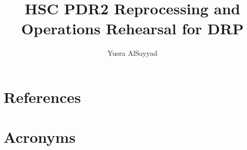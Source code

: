 \documentclass[OPS,authoryear,toc]{lsstdoc}
\title{HSC PDR2 Reprocessing and Operations Rehearsal for DRP}
\author{%
Yusra AlSayyad
}
\date{\vcsDate}
\begin{document}
\maketitle


\appendix
\section{References} \label{sec:bib}
\renewcommand{\refname}{} %


\section{Acronyms} \label{sec:acronyms}

\end{document}
